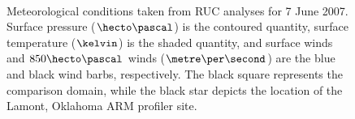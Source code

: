 \begin{figure}[H]
     \begin{center}
%
        \\ %
%
    \end{center}
    \caption{%
        Meteorological conditions taken from RUC analyses for 7 June 2007. Surface pressure ($\hecto\pascal$) is the contoured quantity, surface temperature ($\kelvin$) is the shaded quantity, and surface winds and $850\hecto\pascal$ winds ($\metre\per\second$) are the blue and black wind barbs, respectively. The black square represents the comparison domain, while the black star depicts the location of the Lamont, Oklahoma ARM profiler site.}%
   \label{figure402}
\end{figure}


